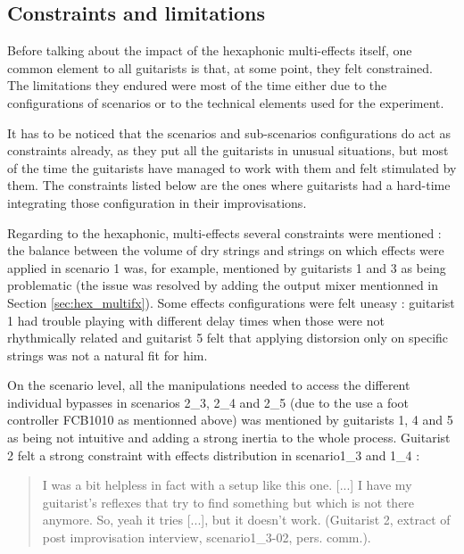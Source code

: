 \documentclass{article}
\begin{document}

\subsection{Constraints and limitations}
Before talking about the impact of the hexaphonic multi-effects itself, one common element to all guitarists is that, at some point, they felt constrained. The limitations they endured were most of the time either due to the configurations of scenarios or to the technical elements used for the experiment.

It has to be noticed that the scenarios and sub-scenarios configurations do act as constraints already, as they put all the guitarists in unusual situations, but most of the time the guitarists have managed to work with them and felt stimulated by them. The constraints listed below are the ones where guitarists had a hard-time integrating those configuration in their improvisations.

Regarding to the hexaphonic, multi-effects several constraints were mentioned : the balance between the volume of dry strings and strings on which effects were applied in scenario 1 was, for example, mentioned by guitarists 1 and 3 as being problematic (the issue was resolved by adding the output mixer mentionned in Section \ref{sec:hex_multifx}). Some effects configurations were felt uneasy : guitarist 1 had trouble playing with different delay times when those were not rhythmically related and guitarist 5 felt that applying distorsion only on specific strings was not a natural fit for him. 

On the scenario level, all the manipulations needed to access the different individual bypasses in scenarios 2\_3, 2\_4 and 2\_5 (due to the use a foot controller FCB1010 as mentionned above) was mentioned by guitarists 1, 4 and 5 as being not intuitive and adding a strong inertia to the whole process.
Guitarist 2 felt a strong constraint with effects distribution in scenario1\_3 and 1\_4 :
    \begin{quote}
        I was a bit helpless in fact with a setup like this one. [...] I have my guitarist's reflexes that try to find something but which is not there anymore. So, yeah it tries [...], but it doesn't work. (Guitarist 2, extract of post improvisation interview, scenario1\_3-02, pers. comm.).
    \end{quote}
\end{document}
